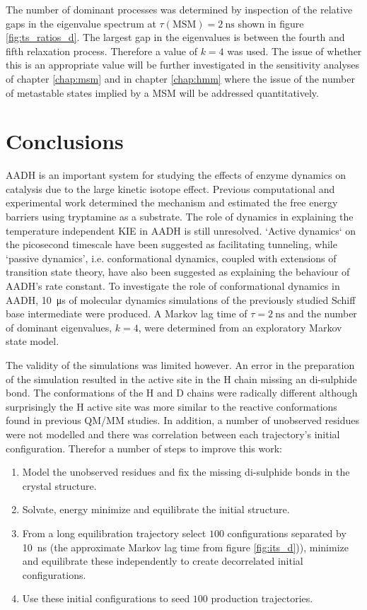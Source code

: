 The number of dominant processes was determined by inspection of the relative gaps in the eigenvalue spectrum at $\tau(\mathrm{MSM})=\SI{2}{\nano\second}$ shown in figure \ref{fig:ts_ratios_d}. The largest gap in the eigenvalues is between the fourth and fifth relaxation process. Therefore a value of $k=4$ was used. The issue of whether this is an appropriate value will be further investigated in the sensitivity analyses of chapter \ref{chap:msm} and in chapter \ref{chap:hmm} where the issue of the number of metastable states implied by a MSM will be addressed quantitatively. 

\section{Conclusions}
AADH is an important system for studying the effects of enzyme dynamics on catalysis due to the large kinetic isotope effect. Previous computational and experimental work determined the mechanism and estimated the free energy barriers using tryptamine as a substrate. The role of dynamics in explaining the temperature independent KIE in AADH is still unresolved. `Active dynamics` on the picosecond timescale have been suggested as facilitating tunneling, while  `passive dynamics', i.e. conformational dynamics, coupled with extensions of transition state theory, have also been suggested as explaining the behaviour of AADH's rate constant. To investigate the role of conformational dynamics in AADH, \SI{10}{\micro\second} of molecular dynamics simulations of the previously studied Schiff base intermediate were produced. A Markov lag time of $\tau=\SI{2}{\nano\second}$ and the number of dominant eigenvalues, $k=4$, were determined from an exploratory Markov state model. 

The validity of the simulations was limited however. An error in the preparation of the simulation resulted in the active site in the H chain missing an di-sulphide bond. The conformations of the H and D chains were radically different although surprisingly the H active site was more similar to the reactive conformations found in previous QM/MM studies. In addition, a number of unobserved residues were not modelled and there was correlation between each trajectory's initial configuration. Therefor a number of steps to improve this work: 

\begin{enumerate}
    \item Model the unobserved residues and fix the missing di-sulphide bonds in the crystal structure. 
    \item Solvate, energy minimize and equilibrate the initial structure. 
    \item From a long equilibration trajectory select $100$ configurations separated by \SI{10}{\nano\second} (the approximate Markov lag time from figure \ref{fig:its_d})), minimize and equilibrate these independently to create decorrelated initial configurations.
    \item  Use these initial configurations to seed $100$ production trajectories.
\end{enumerate}


